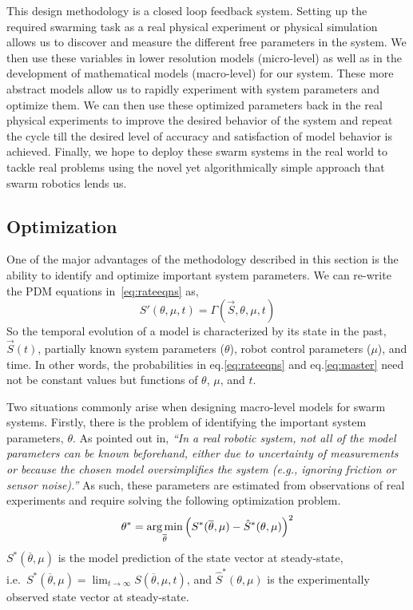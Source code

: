 \documentclass[Main.tex]{subfiles}
\begin{document}
This design methodology is a closed loop feedback system. Setting up the required swarming task as a real physical experiment or physical simulation allows us to discover and measure the different free parameters in the system. We then use these variables in lower resolution models (micro-level) as well as in the development of mathematical models (macro-level) for our system. These more abstract models allow us to rapidly experiment with system parameters and optimize them. We can then use these optimized parameters back in the real physical experiments to improve the desired behavior of the system and repeat the cycle till the desired level of accuracy and satisfaction of  model behavior is achieved. Finally, we hope to deploy these swarm systems in the real world to tackle real problems using the novel yet algorithmically simple approach that swarm robotics lends us.

\subsection{Optimization}\label{sec:opt}
One of the major advantages of the methodology described in this section is the ability to identify and optimize important system parameters. We can re-write the PDM equations in~\eqref{eq:rateeqns} as,
\begin{equation}
S'(\theta,\mu,t) = \Gamma\left(\vec{S}, \theta, \mu, t\right)
\end{equation}
So the temporal evolution of a model is characterized by its state in the past, $\vec{S}(t)$, partially known system parameters ($\theta$), robot control parameters ($\mu$), and time. In other words, the probabilities in eq.\eqref{eq:rateeqns} and eq.\eqref{eq:master} need not be constant values but functions of $\theta$, $\mu$, and $t$.

Two situations commonly arise when designing macro-level models for swarm systems. Firstly, there is the problem of identifying the important system parameters, $\theta$. As pointed out in\cite{Correll2008}, \emph{``In a real robotic system, not all of the model parameters can be known beforehand, either due to uncertainty of measurements or because the chosen model oversimplifies the system (e.g., ignoring friction or sensor noise).''} As such, these parameters are estimated from observations of real experiments and require solving the following optimization problem.
\begin{equation}
	\theta^* = \underset{\overline{\theta}}{\operatorname*{arg\,min}}\left(S^*(\overline{\theta},\mu) - \hat{S}^*(\theta, \mu)\right)^2 \label{eq:thetaopt}
\end{equation}
$S^*(\overline{\theta},\mu)$ is the model prediction of the state vector at steady-state,\\ i.e.~$S^*(\overline{\theta},\mu) = \lim_{t \to \infty}S(\overline{\theta},\mu, t)$, and $\hat{S}^*(\theta, \mu)$ is the experimentally observed state vector at steady-state.
\end{document}
